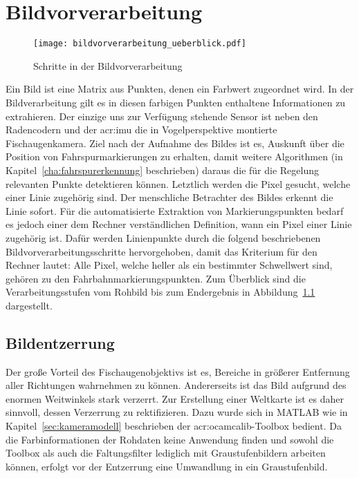 \chapter{Bildvorverarbeitung \dcfirstauthorshort}
\label{cha:bildvorverarbeitung}

\begin{figure}[ht] %
	\centering
	\texttt{[image: bildvorverarbeitung\_ueberblick.pdf]}
	\caption{Schritte in der Bildvorverarbeitung}
	\label{fig:bildvorverarbeitung_ueberblick}
\end{figure} 

Ein Bild ist eine Matrix aus Punkten, denen ein Farbwert zugeordnet wird. In der Bildverarbeitung gilt es in diesen farbigen Punkten enthaltene Informationen zu extrahieren. Der einzige uns zur Verfügung stehende Sensor ist neben den Radencodern und der \gls{acr:imu} die in Vogelperspektive montierte Fischaugenkamera. Ziel nach der Aufnahme des Bildes ist es, Auskunft über die Position von Fahrspurmarkierungen zu erhalten, damit weitere Algorithmen (in Kapitel~\ref{cha:fahrspurerkennung} beschrieben) daraus die für die Regelung relevanten Punkte detektieren können. Letztlich werden die Pixel gesucht, welche einer Linie zugehörig sind. Der menschliche Betrachter des Bildes erkennt die Linie sofort. Für die automatisierte Extraktion von Markierungspunkten bedarf es jedoch einer dem Rechner verständlichen Definition, wann ein Pixel einer Linie zugehörig ist. Dafür werden Linienpunkte durch die folgend beschriebenen Bildvorverarbeitungsschritte hervorgehoben, damit das Kriterium für den Rechner lautet: Alle Pixel, welche heller als ein bestimmter Schwellwert sind, gehören zu den Fahrbahnmarkierungspunkten. Zum Überblick sind die Verarbeitungsstufen vom Rohbild bis zum Endergebnis in Abbildung~\ref{fig:bildvorverarbeitung_ueberblick} dargestellt.

\section{Bildentzerrung}

Der große Vorteil des Fischaugenobjektivs ist es, Bereiche in größerer Entfernung aller Richtungen wahrnehmen zu können. Andererseits ist das Bild aufgrund des enormen Weitwinkels stark verzerrt. Zur Erstellung einer Weltkarte ist es daher sinnvoll, dessen Verzerrung zu rektifizieren. Dazu wurde sich in MATLAB wie in Kapitel~\ref{sec:kameramodell} beschrieben der \gls{acr:ocamcalib}-Toolbox bedient. Da die Farbinformationen der Rohdaten keine Anwendung finden und sowohl die Toolbox als auch die Faltungsfilter lediglich mit Graustufenbildern arbeiten können, erfolgt vor der Entzerrung eine Umwandlung in ein Graustufenbild.

